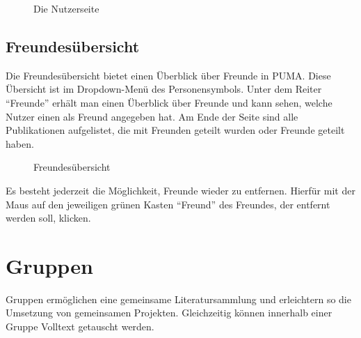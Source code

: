 \begin{figure}[h!]
 \centering
 \caption{Die Nutzerseite}
 \label{fig:nutzerseite}
\end{figure}

\subsection{Freundesübersicht}
\label{subsec:freundesuebersicht}
Die Freundesübersicht bietet einen Überblick über Freunde in PUMA. Diese Übersicht ist im Dropdown-Menü des Personensymbols. Unter dem Reiter \enquote{Freunde} erhält man einen Überblick über Freunde und kann sehen, welche Nutzer einen als Freund angegeben hat. Am Ende der Seite sind alle Publikationen aufgelistet, die mit Freunden geteilt wurden oder Freunde geteilt haben.\newline

\begin{figure}[h!]
 \centering
 \caption{Freundesübersicht}
 \label{fig:freundesuebersicht}
\end{figure}

Es besteht jederzeit die Möglichkeit, Freunde wieder zu entfernen. Hierfür mit der Maus auf den jeweiligen grünen Kasten \enquote{Freund} des Freundes, der entfernt werden soll, klicken.

\section{Gruppen}
\label{sec:gruppen}
Gruppen ermöglichen eine gemeinsame Literatursammlung und erleichtern so die Umsetzung von gemeinsamen Projekten. Gleichzeitig können innerhalb einer Gruppe Volltext getauscht werden.


